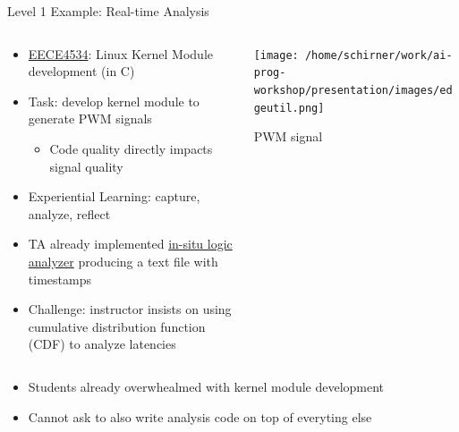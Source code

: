 \documentclass[xcolor=dvipsnames, aspectratio=169]{beamer}
\begin{document}
\begin{frame}{Level 1 Example: Real-time Analysis}
  \begin{columns}[T]
    \begin{column}{0.6\textwidth}
      \begin{itemize}
        \item \href{https://neu-ece-4534.github.io}{EECE4534}: Linux Kernel Module development (in C)
        \item Task: develop kernel module to generate PWM signals
        \begin{itemize}
          \item Code quality directly impacts signal quality
        \end{itemize}
        \item Experiential Learning: capture,  analyze, reflect
        \item TA already implemented \href{https://neu-ece-4534.github.io/pulsecap.html}{in-situ logic analyzer} producing a text file with timestamps
        \item Challenge: instructor insists on using cumulative distribution function (CDF) to analyze latencies  
      \end{itemize}
    \end{column}
    
    \begin{column}{0.35\textwidth}
      \texttt{[image: /home/schirner/work/ai-prog-workshop/presentation/images/edgeutil.png]}
      \tiny\centerline{PWM signal}
    \end{column}
  \end{columns}

  \begin{alertbox}
    \begin{itemize}
      \item Students already overwhealmed with kernel module development
      \item Cannot ask to also write analysis code on top of everyting else
    \end{itemize}
  \end{alertbox}
\end{frame}
\end{document}
